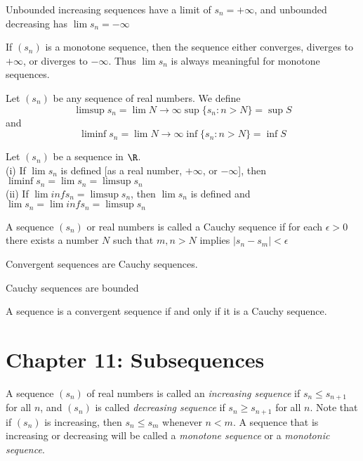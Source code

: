 \documentclass[10pt]{article}
\begin{document}
\begin{thm}
Unbounded increasing sequences have a limit of $s_n = +\infty$, and unbounded decreasing has $\lim s_n = -\infty$
\end{thm}

\begin{cor}
If $(s_n)$ is a monotone sequence, then the sequence either converges, diverges to $+\infty$, or diverges to $-\infty$. Thus $\lim s_n$ is always meaningful for monotone sequences.
\end{cor}

\begin{defn}
Let $(s_n)$ be any sequence of real numbers. We define \begin{equation*}
    \limsup{s_n} = \lim\limits{N \to \infty} \sup \{s_n: n > N\} = \sup S
\end{equation*}
and 
\begin{equation*}
    \liminf{s_n} = \lim\limits{N \to \infty} \inf\{s_n : n > N\} = \inf S
\end{equation*}
\end{defn}

\begin{thm}
Let $(s_n)$ be a sequence in $\R$.\\
(i) If $\lim s_n$ is defined [as a real number, $+\infty$, or $-\infty$], then $\liminf s_n = \lim s_n = \limsup s_n$\\
(ii) If $\lim inf s_n = \limsup s_n$, then $\lim s_n$ is defined and $\lim s_n = \lim inf s_n = \limsup s_n$
\end{thm}

\begin{defn}
A sequence $(s_n)$ or real numbers is called a Cauchy sequence if for each $\epsilon > 0$ there exists a number $N$ such that $m, n > N$ implies $|s_n - s_m| < \epsilon$
\end{defn}

\begin{lem}
Convergent sequences are Cauchy sequences.
\end{lem}

\begin{lem}
Cauchy sequences are bounded
\end{lem}

\begin{thm}
A sequence is a convergent sequence if and only if it is a Cauchy sequence.
\end{thm}

\section*{Chapter 11: Subsequences}
\begin{defn}
A sequence $(s_n)$ of real numbers is called an \emph{increasing sequence} if $s_n\le s_{n+1}$ for all $n$, and $(s_n)$ is called \emph{decreasing sequence} if $s_n\ge s_{n+1}$ for all $n$. Note that if $(s_n)$ is increasing, then $s_n\le s_m$ whenever $n< m$. A sequence that is increasing or decreasing will be called a \emph{monotone sequence} or a \emph{monotonic sequence}.
\end{defn}
\end{document}
